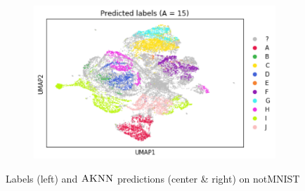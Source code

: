 \documentclass{article}
\newcommand{\algname}{\textsc{AKNN}}
\begin{document}
\begin{figure}
\begin{subfigure}[t]{0.34\textwidth}
        \includegraphics[width=\linewidth]{figs/notMNIST/notMNIST_preds_Aeq15.png} %
    \end{subfigure}
  \caption{Labels (left) and $\algname$ predictions (center \& right) on notMNIST}
  \label{fig:varyingparam}
\end{figure}
\end{document}
